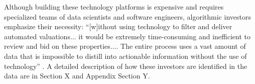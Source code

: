 \documentclass[11pt]{article}
\newcommand{\LR}[1]{{\color{blue}{[LR: #1]}}}
\begin{document}
Although building these technology platforms is expensive and requires specialized teams of data scientists and software engineers, algorithmic investors emphasize their necessity: ``[w]ithout using technology to filter and deliver automated valuations... it would be extremely time-consuming and inefficient to review and bid on these properties.... The entire process uses a vast amount of data that is impossible to distill into actionable information without the use of technology'' \citep{amherstsfr2016, christopher2023}. 
\LR{TO FILL IN }
A detailed description of how these investors are identified in the data are in Section X and Appendix Section Y. 











\end{document}
